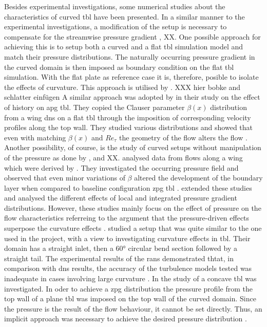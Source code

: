 Besides experimental investigations, some numerical studies about the characteristics of curved \acrshort{tbl} have been presented.
%
In a similar manner to  the experimental investigations, a modification of the setup is necessary to compensate for the streamwise pressure gradient
 \citet{appelbaum_systematic_2025}, XX. 
One possible approach for achieving this  is to setup  both a curved and a flat \acrshort{tbl} simulation model and match their pressure distributions.
The naturally occurring pressure gradient in the curved domain is then imposed as boundary condition on the flat \acrshort{tbl} simulation.
With the flat plate as reference case it is, therefore, posible to isolate the effects of curvature.
This approach is utilised  by \citet{spalart_direct_2024,pargal_adverse-pressure-gradient_2022}.
XXX hier bobke and schlatter einfügen
A similar approach was adopted by \citet{bobke_history_2017}  in their study on the effect of history on \acrshort{apg} \acrshort{tbl}.
They copied  the Clauser parameter  $\beta(x)$ distribution from a wing \acrshort{dns} on a flat \acrshort{tbl} through the imposition of corresponding velocity profiles along the top wall.
They studied various distributions and showed that even with matching $\beta(x)$ and $Re_{\tau}$ the geometry of the flow alters the flow \citep{bobke_history_2017}.
Another possibility, of course, is the study of curved setups without manipulation of the pressure as done by \citet{vinuesa_pressure-gradient_2017,tanarro_effect_2020}, and XX.
\citet{vinuesa_pressure-gradient_2017} analysed data from flows along a wing which were derived by \citet{hosseini_direct_2016}.
They investigated the occurring pressure field and observed that even minor variations of $\beta$ altered
 the development of the boundary layer when compared to baseline configuration \acrshort{zpg} \acrshort{tbl} \citet{vinuesa_pressure-gradient_2017}.
\citet{tanarro_effect_2020} extended these studies and analysed the different effects of local and integrated pressure gradient distributions.
However, these studies mainly focus on the effect of pressure on the flow characteristics referreing to the argument that the pressure-driven effects superpose the curvature effects \citep{patel_longitudinal_1997}.
\citet{yang_assessment_2016} studied a  setup that was quite similar  to the one used in the project, with a view  to investigating curvature effects in \acrshort{tbl}. 
Their domain has a straight inlet, then a 60° circular bend section followed by a straight tail.
The experimental results of the \acrshort{rans} demonstrated thtat, in comparison with \acrshort{dns} results, the accuracy of the  turbulence models tested was inadequate in cases involving large curvature \citep{yang_assessment_2016}.
In the study of \citep{appelbaum_systematic_2025} a concave \acrshort{tbl} was investigated. 
In oder to achieve a \acrshort{zpg} distribution the pressure profile from the top wall of a plane \acrshort{tbl} was imposed on the top wall of the curved domain.
Since the pressure is the result of the flow behaviour, it cannot be set directly. Thus, an implicit approach was necessary to achieve the desired pressure distribution \citep{appelbaum_systematic_2025}.

